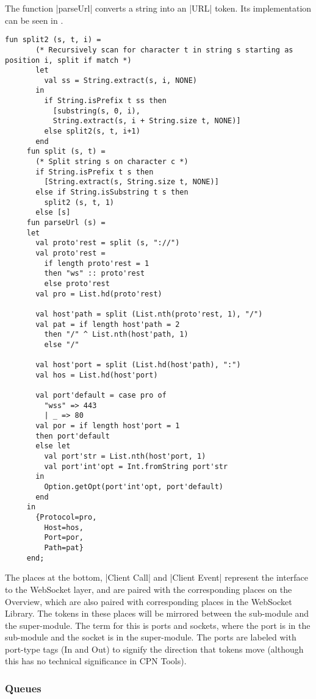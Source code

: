 	The function |parseUrl| converts a string into an |URL| token. Its
	implementation can be seen in . 
	
	\begin{lstlisting}[label=lst:client_app_parseUrl,caption=parseUrl and related
	functions,gobble=1] 
	fun split2 (s, t, i) =
	   (* Recursively scan for character t in string s starting as position i, split if match *)
	   let
	     val ss = String.extract(s, i, NONE) 
	   in 
	     if String.isPrefix t ss then
	       [substring(s, 0, i), 
	       String.extract(s, i + String.size t, NONE)]
	     else split2(s, t, i+1)
	   end
	 fun split (s, t) = 
	   (* Split string s on character c *)
	   if String.isPrefix t s then
	     [String.extract(s, String.size t, NONE)]
	   else if String.isSubstring t s then
	     split2 (s, t, 1)
	   else [s]
	 fun parseUrl (s) = 
	 let
	   val proto'rest = split (s, "://")
	   val proto'rest = 
	     if length proto'rest = 1 
	     then "ws" :: proto'rest 
	     else proto'rest 
	   val pro = List.hd(proto'rest)
	 
	   val host'path = split (List.nth(proto'rest, 1), "/")
	   val pat = if length host'path = 2
	     then "/" ^ List.nth(host'path, 1)
	     else "/"
	   
	   val host'port = split (List.hd(host'path), ":")
	   val hos = List.hd(host'port)
	 
	   val port'default = case pro of
	     "wss" => 443
	     | _ => 80
	   val por = if length host'port = 1 
	   then port'default
	   else let
	     val port'str = List.nth(host'port, 1)
	     val port'int'opt = Int.fromString port'str
	   in
	     Option.getOpt(port'int'opt, port'default)
	   end
	 in
	   {Protocol=pro, 
	     Host=hos, 
	     Port=por, 
	     Path=pat}
	 end;
	\end{lstlisting}
	
	The places at the bottom, |Client Call| and |Client Event| represent the
	interface to the WebSocket layer, and are paired with the corresponding places
	on the Overview, which are also paired with corresponding places in the
	WebSocket Library. The tokens in these places will be mirrored between the
	sub-module and the super-module. The term for this is ports and sockets,
	where the port is in the sub-module and the socket is in the super-module. The
	ports are labeled with port-type tags (In and Out) to signify the direction
	that tokens move (although this has no technical significance in CPN Tools).
	
	
	\subsubsection{Queues}
	
